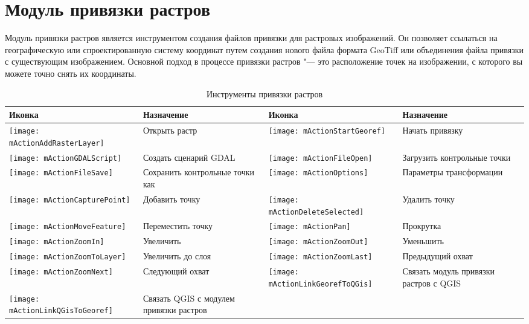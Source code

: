 
\section{Модуль привязки растров}


Модуль привязки растров является инструментом создания файлов привязки
для растровых изображений. Он позволяет ссылаться на географическую или
спроектированную систему координат путем создания нового файла формата
GeoTiff или объединения файла привязки с существующим изображением.
Основной подход в процессе привязки растров "--- это расположение точек на
изображении, с которого вы можете точно снять их координаты.


\begin{table}[h]
\begin{tabular}{|m{1cm}|m{6cm}|m{1cm}|m{6cm}|}
 \hline \textbf{Иконка} & \textbf{Назначение} & \textbf{Иконка} &
 \textbf{Назначение} \\
 \hline \texttt{[image: mActionAddRasterLayer]} & Открыть растр &
 \texttt{[image: mActionStartGeoref]} & Начать привязку \\
 \hline \texttt{[image: mActionGDALScript]} & Создать сценарий GDAL &
 \texttt{[image: mActionFileOpen]} & Загрузить контрольные точки \\
 \hline \texttt{[image: mActionFileSave]} & Сохранить контрольные точки как &
 \texttt{[image: mActionOptions]} & Параметры трансформации \\
 \hline \texttt{[image: mActionCapturePoint]} & Добавить точку &
 \texttt{[image: mActionDeleteSelected]} & Удалить точку \\
 \hline \texttt{[image: mActionMoveFeature]} & Переместить точку &
\texttt{[image: mActionPan]} & Прокрутка \\
 \hline \texttt{[image: mActionZoomIn]} & Увеличить &
 \texttt{[image: mActionZoomOut]} & Уменьшить \\
 \hline \texttt{[image: mActionZoomToLayer]} & Увеличить до слоя &
 \texttt{[image: mActionZoomLast]} & Предыдущий охват \\
 \hline \texttt{[image: mActionZoomNext]} & Следующий охват &
 \texttt{[image: mActionLinkGeorefToQGis]} & Связать модуль привязки растров с QGIS \\
 \hline \texttt{[image: mActionLinkQGisToGeoref]} & Связать QGIS с модулем привязки растров &
 &  \\
\hline
\end{tabular}
\caption{Инструменты привязки растров}\label{tab:georeferencer_tools}
\end{table}

